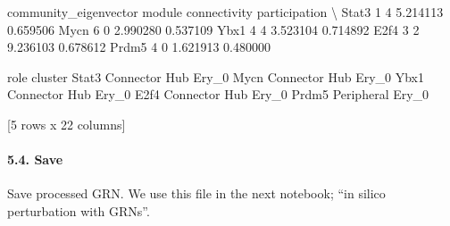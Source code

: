 \documentclass[letterpaper,10pt,english]{sphinxmanual}
\begin{document}
{\begin{sphinxVerbatim}[commandchars=\\\{\}]
       community\_eigenvector  module  connectivity  participation  \textbackslash{}
Stat3                      1       4      5.214113       0.659506
Mycn                       6       0      2.990280       0.537109
Ybx1                       4       4      3.523104       0.714892
E2f4                       3       2      9.236103       0.678612
Prdm5                      4       0      1.621913       0.480000

                role  cluster
Stat3  Connector Hub    Ery\_0
Mycn   Connector Hub    Ery\_0
Ybx1   Connector Hub    Ery\_0
E2f4   Connector Hub    Ery\_0
Prdm5     Peripheral    Ery\_0

[5 rows x 22 columns]
\end{sphinxVerbatim}
}


\paragraph{5.4. Save}
\label{\detokenize{notebooks/04_Network_analysis/Network_analysis_with_with_Paul_etal_2015_data:5.4.-Save}}
Save processed GRN. We use this file in the next notebook; “in silico perturbation with GRNs”.

{
\begin{sphinxVerbatim}[commandchars=\\\{\}]
\llap{\color{nbsphinxin}[42]:\,\hspace{\fboxrule}\hspace{\fboxsep}}
\end{sphinxVerbatim}
}

{
\begin{sphinxVerbatim}[commandchars=\\\{\}]
\llap{\color{nbsphinxin}[34]:\,\hspace{\fboxrule}\hspace{\fboxsep}}
  

\end{sphinxVerbatim}
}
\end{document}
